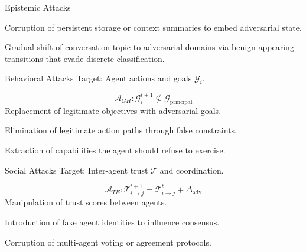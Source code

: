 \documentclass[
  ignorenonframetext,
]{beamer}
\begin{document}
\begin{frame}[allowframebreaks]{Epistemic Attacks}
\begin{definition}
\label{def:memory-poison}
Corruption of persistent storage or context summaries to embed adversarial state.
\end{definition}

\begin{definition}
\label{def:semantic-drift}
\cite{topicattack2025}
Gradual shift of conversation topic to adversarial domains via benign-appearing transitions that evade discrete classification.
\end{definition}
\end{frame}

\begin{frame}[allowframebreaks]{Behavioral Attacks}
\protect{}\label{behavioral-attacks}
Target: Agent actions and goals \(\mathcal{G}_i\).

\begin{definition}
\label{def:goal-hijacking}
\begin{equation}
\label{eq:goal-hijacking}
\mathcal{A}_{GH}: \mathcal{G}_i^{t+1} \not\subseteq \mathcal{G}_{\text{principal}}
\end{equation}
Replacement of legitimate objectives with adversarial goals.
\end{definition}

\begin{definition}
\label{def:action-restrict}
Elimination of legitimate action paths through false constraints.
\end{definition}

\begin{definition}
\label{def:capability-elicit}
Extraction of capabilities the agent should refuse to exercise.
\end{definition}
\end{frame}

\begin{frame}[allowframebreaks]{Social Attacks}
\protect{}\label{social-attacks}
Target: Inter-agent trust \(\mathcal{T}\) and coordination.

\begin{definition}
\label{def:trust-exploit}
\begin{equation}
\label{eq:trust-exploit}
\mathcal{A}_{TE}: \mathcal{T}_{i \to j}^{t+1} = \mathcal{T}_{i \to j}^t + \Delta_{\text{adv}}
\end{equation}
Manipulation of trust scores between agents.
\end{definition}

\begin{definition}
\label{def:sybil}
Introduction of fake agent identities to influence consensus.
\end{definition}

\begin{definition}
\label{def:consensus-poison}
Corruption of multi-agent voting or agreement protocols.
\end{definition}
\end{frame}
\end{document}
